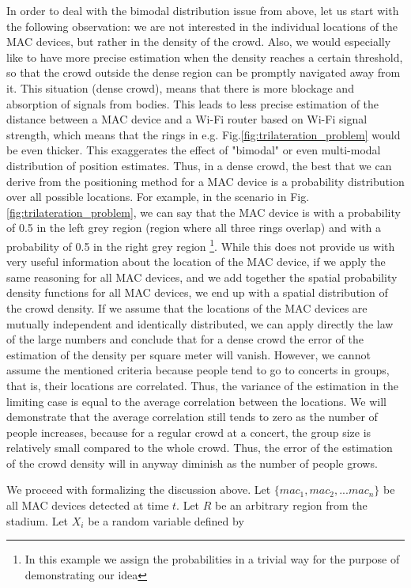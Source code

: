 \documentclass[10pt,a4paper]{article}
\begin{document}
In order to deal with the bimodal distribution issue  from above,  let us start with the following observation: we are not interested in the individual locations of the MAC devices, but rather in the density of the crowd. Also, we would  especially like to have more precise estimation when the density reaches a certain threshold, so that the crowd outside the dense region can be promptly navigated away from it. 
This situation (dense crowd), means that there is more blockage and absorption of signals from bodies. This leads to less precise estimation of the distance between a MAC device and a Wi-Fi router based on Wi-Fi signal strength, which means that the rings in e.g.  Fig.\ref{fig:trilateration_problem} would be even thicker. This exaggerates the effect of "bimodal" or even multi-modal distribution of position estimates. Thus, in a dense crowd, the best that we can derive from the positioning method for a MAC device is a probability distribution over all possible locations. For example, in the scenario in Fig. \ref{fig:trilateration_problem}, we can say that the MAC device is with a probability of 0.5 in the left grey region (region where all three rings overlap) and with a probability of 0.5 in the right grey region \footnote{In this example we assign the probabilities in a trivial way for the purpose of demonstrating our idea}. While this does not provide us with  very useful information about the location of the MAC device, if we apply the same reasoning for all MAC devices, and we add together the spatial probability density functions for all MAC devices, we end up with a spatial distribution of the crowd density. If we assume that the locations of the MAC devices are mutually independent and identically distributed, we can apply directly the law of the large numbers and conclude that for a dense crowd the error of the estimation of the density per square meter will vanish. However, we cannot assume the mentioned criteria because people tend to go to concerts in groups, that is, their locations are correlated. Thus, the variance of the estimation in the limiting case is equal to the average correlation between the locations.
We will demonstrate that the average correlation still tends to zero as the number of people increases,  because for a regular crowd at a concert, the group size is relatively small compared to the whole crowd. Thus, the error of the estimation of the crowd density will in anyway diminish as the number of people grows. 

We proceed with formalizing the discussion above. 
Let $\{mac_1, mac_2,...mac_n\}$ be all MAC devices detected at time $t$. Let $R$ be an arbitrary region from the stadium.  Let $X_i$ be a random variable defined by
\end{document}
